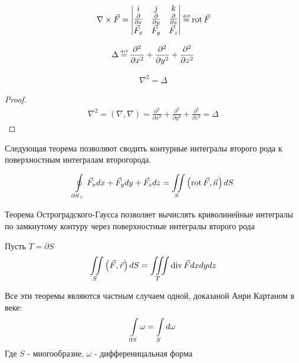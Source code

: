 \begin{definition}
	\begin{gather*}
		\nabla \times \vec{F} = 
		\begin{vmatrix}
			i & j & k \\
			\pdiff{}{x} & \pdiff{}{y} & \pdiff{}{z} \\
			\vec{F}_x & \vec{F}_y & \vec{F}_z \notag
		\end{vmatrix}
		\defeq \rot \vec{F}
	\end{gather*}
\end{definition}

\begin{definition}
	\begin{gather*}
	\Delta \defeq 
		 \frac{\partial^2}{\partial x^2} +
		 \frac{\partial^2}{\partial y^2} + 
		 \frac{\partial^2}{\partial z^2}
	\end{gather*}
\end{definition}

\begin{theorem}[О треугольниках]
	\begin{gather*}
		\nabla^2 = \Delta
	\end{gather*}
\end{theorem}

\begin{proof}
	\begin{gather*}
		\nabla^2 = \left( \nabla , \nabla \right) = 
		\frac{\partial^2}{\partial x^2} +
		\frac{\partial^2}{\partial y^2} + 
		\frac{\partial^2}{\partial z^2}
		= \Delta
	\end{gather*}
\end{proof}

Следующая теорема позволяют сводить контурные интегралы второго рода к 
поверхностным интегралам второгорода.

\begin{theorem}
	\begin{gather*}
		\oint\limits_{\partial S_{+}} \vec{F}_x dx + \vec{F}_y dy + \vec{F}_z dz =
		\iint\limits_{S} \left( \operatorname{rot} \vec{F}, \vec{n}\right)dS
	\end{gather*}
\end{theorem}
Теорема Остроградского-Гаусса позволяет вычислять криволинейные интегралы 
по замкнутому контуру через поверхностные интегралы второго рода
\begin{theorem}
	Пусть $T = \partial S$
	\begin{gather*}
		\iint\limits_{S} \left( \vec{F}, \vec{r}\right)dS = 
		\iiint\limits_{T} \operatorname{div} \vec{F} dxdydz
	\end{gather*}
\end{theorem}

\begin{nb}
	Все эти теоремы являются частным случаем одной, доказаной Анри Картаном в 
	 веке:
	\begin{gather*}
		\int\limits_{\partial S} \omega = \int\limits_{S} d\omega
	\end{gather*}
	Где $S$ - многообразие, $\omega$ - дифференицальная форма
\end{nb}
